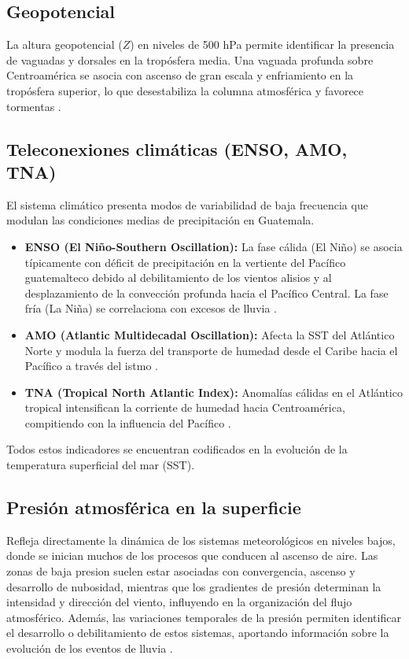 \subsection{Geopotencial}
La altura geopotencial (\(Z\)) en niveles de 500 hPa permite identificar la presencia de vaguadas y dorsales en la tropósfera media. Una vaguada profunda sobre Centroamérica se asocia con ascenso de gran escala y enfriamiento en la tropósfera superior, lo que desestabiliza la columna atmosférica y favorece tormentas \citep{houze2014cloud, raible2003precipitation}.

\subsection{Teleconexiones climáticas (ENSO, AMO, TNA)}
El sistema climático presenta modos de variabilidad de baja frecuencia que modulan las condiciones medias de precipitación en Guatemala.
\begin{itemize}
    \item \textbf{ENSO (El Niño-Southern Oscillation):} La fase cálida (El Niño) se asocia típicamente con déficit de precipitación en la vertiente del Pacífico guatemalteco debido al debilitamiento de los vientos alisios y al desplazamiento de la convección profunda hacia el Pacífico Central. La fase fría (La Niña) se correlaciona con excesos de lluvia \citep{raible2003precipitation, dai2000global, van2005searching, sun2015global}.
    \item \textbf{AMO (Atlantic Multidecadal Oscillation):} Afecta la SST del Atlántico Norte y modula la fuerza del transporte de humedad desde el Caribe hacia el Pacífico a través del istmo \citep{lin2022atlantic, wyatt2012atlantic}.
    \item \textbf{TNA (Tropical North Atlantic Index):} Anomalías cálidas en el Atlántico tropical intensifican la corriente de humedad hacia Centroamérica, compitiendo con la influencia del Pacífico \citep{maldonado2017early, perez2021combined}.
\end{itemize}

Todos estos indicadores se encuentran codificados en la evolución de la temperatura superficial del mar (SST).

\subsection{Presión atmosférica en la superficie}

Refleja directamente la dinámica de los sistemas meteorológicos en niveles bajos, donde se inician muchos de los procesos que conducen al ascenso de aire. Las zonas de baja presion suelen estar asociadas con convergencia, ascenso y desarrollo de nubosidad, mientras que los gradientes de presión determinan la intensidad y dirección del viento, influyendo en la organización del flujo atmosférico. Además, las variaciones temporales de la presión permiten identificar el desarrollo o debilitamiento de estos sistemas, aportando información sobre la evolución de los eventos de lluvia \citep{houze2014cloud, trenberth2005relationships, spengler2011does, dyer1976meridional}.

